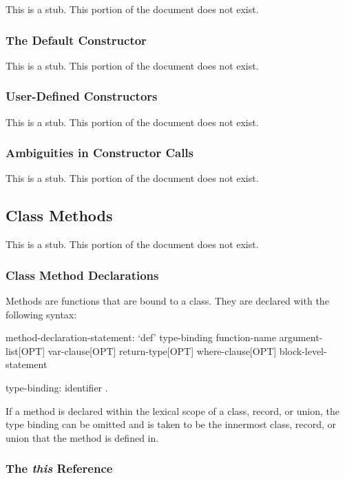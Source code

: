 This is a stub.  This portion of the document does not exist.

\subsubsection{The Default Constructor}
\label{The_Default_Constructor}

This is a stub.  This portion of the document does not exist.

\subsubsection{User-Defined Constructors}
\label{User-Defined_Constructors}

This is a stub.  This portion of the document does not exist.

\subsubsection{Ambiguities in Constructor Calls}
\label{Ambiguities_in_Constructor_Calls}

This is a stub.  This portion of the document does not exist.

\subsection{Class Methods}
\label{Class_Methods}

This is a stub.  This portion of the document does not exist.

\subsubsection{Class Method Declarations}
\label{Class_Method_Declarations}

Methods are functions that are bound to a class.  They are declared
with the following syntax:
\begin{syntax}
method-declaration-statement:
  `def' type-binding function-name argument-list[OPT] var-clause[OPT]
    return-type[OPT] where-clause[OPT] block-level-statement

type-binding:
  identifier .
\end{syntax}

If a method is declared within the lexical scope of a class, record,
or union, the type binding can be omitted and is taken to be the
innermost class, record, or union that the method is defined in.

\subsubsection{The {\em this} Reference}
\label{The_em_this_Reference}

